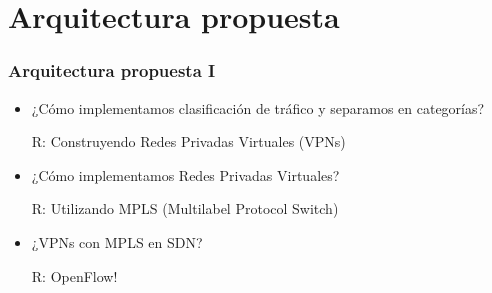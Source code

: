 \documentclass{beamer}
\begin{document}
\section{Arquitectura propuesta} 
\frame{\tableofcontents[currentsection]}

\begin{frame}
\frametitle{Arquitectura propuesta I} 

\begin{itemize}
\item ¿C\'omo implementamos clasificación de tr\'afico y separamos en categorías?

\pause
{\color{blue}R: Construyendo Redes Privadas Virtuales (VPNs)}
\pause

\vspace{0.5cm}
\item ¿C\'omo implementamos Redes Privadas Virtuales?

\pause
{\color{blue}R: Utilizando MPLS (Multilabel Protocol Switch)}

\pause
\vspace{0.5cm}
\item ¿VPNs con MPLS en SDN?

\pause
{\color{blue}R: OpenFlow!}

\end{itemize}

\end{frame}


%
%
%
%
\end{document}
